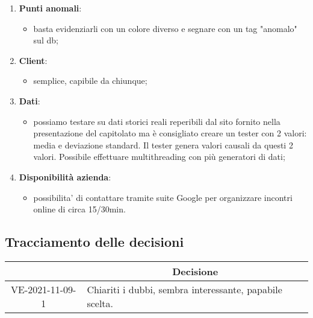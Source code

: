 \begin{enumerate}
\begin{itemize}
		\end{itemize}
	\item \textbf{Punti anomali}:
		\begin{itemize}
			\item basta evidenziarli con un colore diverso e segnare con un tag "anomalo" sul db;
		\end{itemize}
	\item \textbf{Client}:
		\begin{itemize}
			\item semplice, capibile da chiunque;
		\end{itemize}
	\item \textbf{Dati}:
		\begin{itemize}
			\item possiamo testare su dati storici reali reperibili dal sito fornito nella presentazione del capitolato ma è consigliato creare un tester con 2 valori: media e deviazione standard. Il tester genera valori causali da questi 2 valori. Possibile effettuare multithreading con più generatori di dati;
		\end{itemize}
	\item \textbf{Disponibilità azienda}:
		\begin{itemize}
			\item possibilita' di contattare tramite suite Google per organizzare incontri online di circa 15/30min.
		\end{itemize}
\end{enumerate}

\pagebreak

\subsection{Tracciamento delle decisioni}

\begin{table}[H]
	\centering
	\renewcommand{\arraystretch}{1.8}
	\begin{tabular}{c | p{10cm}}
		\rowcolor[HTML]{125E28}
		\multicolumn{1}{c}{\color[HTML]{FFFFFF} \textbf{ID}} &
		\multicolumn{1}{c}{\color[HTML]{FFFFFF} \textbf{Decisione}} \\
		\hline
		VE-2021-11-09-1 & Chiariti i dubbi, sembra interessante, papabile scelta. \\
	\end{tabular}
\end{table}